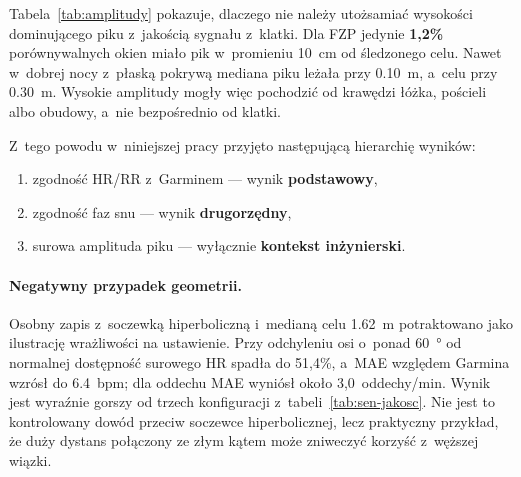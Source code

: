 \documentclass[12pt,a4paper,oneside]{report}
\begin{document}
\begin{table}[H]
\centering
\caption{Amplituda dominującego odbicia a~zgodność z~celem.}
\label{tab:amplitudy}
\small
{}
\end{table}

Tabela~\ref{tab:amplitudy} pokazuje, dlaczego nie należy utożsamiać wysokości
dominującego piku z~jakością sygnału z~klatki. Dla FZP jedynie
\textbf{1,2\%} porównywalnych okien miało pik w~promieniu \SI{10}{cm} od
śledzonego celu. Nawet w~dobrej nocy z~płaską pokrywą mediana piku leżała przy
\SI{0.10}{m}, a~celu przy \SI{0.30}{m}. Wysokie amplitudy mogły więc pochodzić
od krawędzi łóżka, pościeli albo obudowy, a~nie bezpośrednio od klatki.

Z~tego powodu w~niniejszej pracy przyjęto następującą hierarchię wyników:
\begin{enumerate}
  \item zgodność HR/RR z~Garminem --- wynik \textbf{podstawowy},
  \item zgodność faz snu --- wynik \textbf{drugorzędny},
  \item surowa amplituda piku --- wyłącznie \textbf{kontekst inżynierski}.
\end{enumerate}

\paragraph{Negatywny przypadek geometrii.} Osobny zapis z~soczewką
hiperboliczną i~medianą celu \SI{1.62}{m} potraktowano jako ilustrację
wrażliwości na ustawienie. Przy odchyleniu osi o~ponad \SI{60}{\degree} od
normalnej dostępność surowego HR spadła do 51,4\%, a~MAE względem Garmina
wzrósł do \SI{6.4}{bpm}; dla oddechu MAE wyniósł około
3,0~oddechy/min. Wynik jest wyraźnie gorszy od trzech konfiguracji
z~tabeli~\ref{tab:sen-jakosc}. Nie jest to kontrolowany dowód przeciw soczewce
hiperbolicznej, lecz praktyczny przykład, że duży dystans połączony ze złym
kątem może zniweczyć korzyść z~węższej wiązki.
\end{document}
